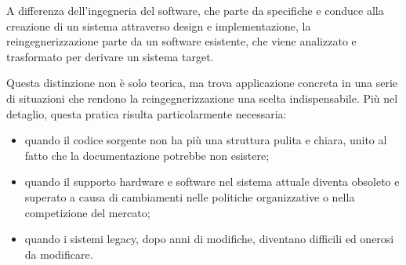 A differenza dell'ingegneria del software, che parte da specifiche e conduce alla creazione di un sistema attraverso design e implementazione, la reingegnerizzazione parte da un software esistente, che viene analizzato e trasformato per derivare un sistema target.

Questa distinzione non è solo teorica, ma trova applicazione concreta in una serie di situazioni che rendono la reingegnerizzazione una scelta indispensabile. Più nel detaglio, questa pratica risulta particolarmente necessaria:
\begin{itemize}
  \item quando il codice sorgente non ha più una struttura pulita e chiara, unito al fatto che la documentazione potrebbe non esistere;
  \item quando il supporto hardware e software nel sistema attuale diventa obsoleto e superato a causa di cambiamenti nelle politiche organizzative o nella competizione del mercato;
  \item quando i sistemi legacy, dopo anni di modifiche, diventano difficili ed onerosi da modificare.
\end{itemize}

